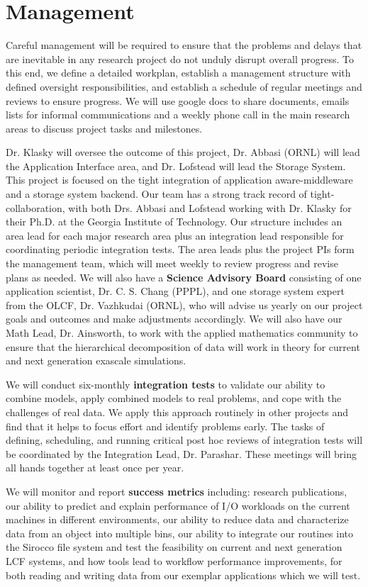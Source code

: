 \section{Management}
\label{sec:management}

Careful management will be required to ensure that the problems and delays that are inevitable in any research project
do not unduly disrupt overall progress. To this end, we define a detailed workplan,
establish a  management structure with defined oversight responsibilities, and establish a schedule of regular meetings and
reviews to ensure progress.  We will use google docs to share documents, emails lists for informal communications and a 
weekly phone call in the main research areas to discuss project tasks and milestones. 

Dr. Klasky will oversee the outcome of this project,  Dr. Abbasi (ORNL) will lead the Application Interface area, and Dr. Lofstead
will lead the Storage System. This project is focused on the tight integration of application aware-middleware and a storage system backend.
Our team has a strong track record of tight-collaboration, with both Drs. Abbasi and Lofstead working with Dr. Klasky for their Ph.D. at the Georgia
Institute of Technology.  Our structure includes an area lead for each major research area plus
an integration lead responsible for coordinating periodic integration tests. The area leads plus the project PIs
form the management team, which will meet weekly to review progress and revise plans as needed.
We will also have a {\bf Science Advisory Board} consisting of one application scientist, Dr. C. S. Chang (PPPL), and one storage system expert from the 
OLCF, Dr. Vazhkudai (ORNL), who will advise us yearly on our project goals and outcomes and make adjustments accordingly. We will also have our
Math Lead, Dr. Ainsworth, to work with the applied mathematics community to ensure that the hierarchical decomposition of data will work in theory
for current and next generation exascale simulations. 

We will conduct six-monthly {\bf integration tests}  to validate our ability to combine models, apply
combined models to real problems, and cope with the challenges of real data. We apply this approach routinely
in other projects and find that it helps to focus effort and identify problems early. The tasks of defining,
scheduling, and running critical post hoc reviews of integration tests will be coordinated by the Integration Lead, Dr. Parashar. 
These meetings will bring all hands together at least once per year.

We will monitor and report {\bf success metrics} including: 
research publications, 
our ability to predict and explain performance of I/O workloads on the current machines in different environments, 
our ability to reduce data and characterize data from an object into multiple bins, 
our ability to integrate our routines into the Sirocco file system and test the feasibility on current and next generation LCF systems, and
how tools lead to workflow performance improvements, for both reading and writing data from our exemplar applications which we will test.
